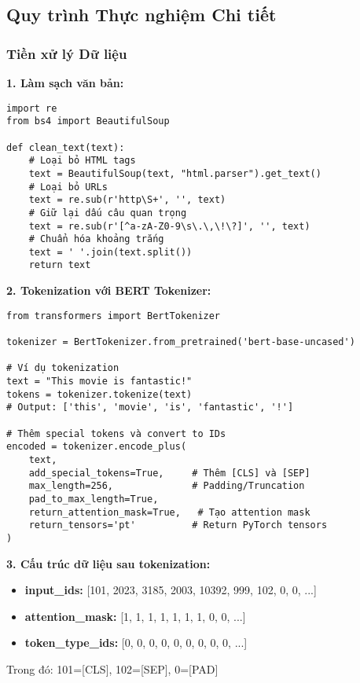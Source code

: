 \subsection{Quy trình Thực nghiệm Chi tiết}
\label{ssec:quy_trinh_thuc_nghiem_sa}

\subsubsection{Tiền xử lý Dữ liệu}

\textbf{1. Làm sạch văn bản:}
\begin{verbatim}
import re
from bs4 import BeautifulSoup

def clean_text(text):
    # Loại bỏ HTML tags
    text = BeautifulSoup(text, "html.parser").get_text()
    # Loại bỏ URLs
    text = re.sub(r'http\S+', '', text)
    # Giữ lại dấu câu quan trọng
    text = re.sub(r'[^a-zA-Z0-9\s\.\,\!\?]', '', text)
    # Chuẩn hóa khoảng trắng
    text = ' '.join(text.split())
    return text
\end{verbatim}

\textbf{2. Tokenization với BERT Tokenizer:}
\begin{verbatim}
from transformers import BertTokenizer

tokenizer = BertTokenizer.from_pretrained('bert-base-uncased')

# Ví dụ tokenization
text = "This movie is fantastic!"
tokens = tokenizer.tokenize(text)
# Output: ['this', 'movie', 'is', 'fantastic', '!']

# Thêm special tokens và convert to IDs
encoded = tokenizer.encode_plus(
    text,
    add_special_tokens=True,     # Thêm [CLS] và [SEP]
    max_length=256,              # Padding/Truncation
    pad_to_max_length=True,
    return_attention_mask=True,   # Tạo attention mask
    return_tensors='pt'          # Return PyTorch tensors
)
\end{verbatim}

\textbf{3. Cấu trúc dữ liệu sau tokenization:}
\begin{itemize}
    \item \textbf{input\_ids:} [101, 2023, 3185, 2003, 10392, 999, 102, 0, 0, ...]
    \item \textbf{attention\_mask:} [1, 1, 1, 1, 1, 1, 1, 0, 0, ...]
    \item \textbf{token\_type\_ids:} [0, 0, 0, 0, 0, 0, 0, 0, 0, ...]
\end{itemize}

Trong đó: 101=[CLS], 102=[SEP], 0=[PAD]

